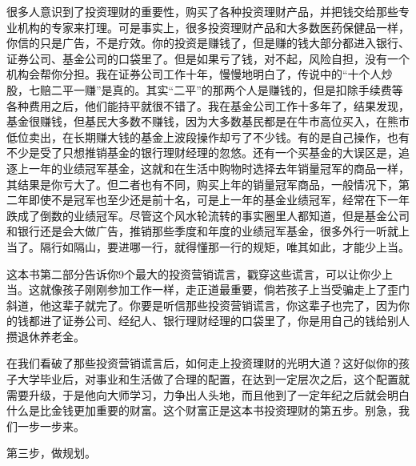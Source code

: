 很多人意识到了投资理财的重要性，购买了各种投资理财产品，并把钱交给那些专业机构的专家来打理。可是事实上，很多投资理财产品和大多数医药保健品一样，你信的只是广告，不是疗效。你的投资是赚钱了，但是赚的钱大部分都进入银行、证券公司、基金公司的口袋里了。但是如果亏了钱，对不起，风险自担，没有一个机构会帮你分担。我在证券公司工作十年，慢慢地明白了，传说中的“十个人炒股，七赔二平一赚”是真的。其实“二平”的那两个人是赚钱的，但是扣除手续费等各种费用之后，他们能持平就很不错了。我在基金公司工作十多年了，结果发现，基金很赚钱，但基民大多数不赚钱，因为大多数基民都是在牛市高位买入，在熊市低位卖出，在长期赚大钱的基金上波段操作却亏了不少钱。有的是自己操作，也有不少是受了只想推销基金的银行理财经理的忽悠。还有一个买基金的大误区是，追逐上一年的业绩冠军基金，这就和在生活中购物时选择去年销量冠军的商品一样，其结果是你亏大了。但二者也有不同，购买上年的销量冠军商品，一般情况下，第二年即使不是冠军也至少还是前十名，可是上一年的基金业绩冠军，经常在下一年跌成了倒数的业绩冠军。尽管这个风水轮流转的事实圈里人都知道，但是基金公司和银行还是会大做广告，推销那些季度和年度的业绩冠军基金，很多外行一听就上当了。隔行如隔山，要进哪一行，就得懂那一行的规矩，唯其如此，才能少上当。

这本书第二部分告诉你9个最大的投资营销谎言，戳穿这些谎言，可以让你少上当。这就像孩子刚刚参加工作一样，走正道最重要，倘若孩子上当受骗走上了歪门斜道，他这辈子就完了。你要是听信那些投资营销谎言，你这辈子也完了，因为你的钱都进了证券公司、经纪人、银行理财经理的口袋里了，你是用自己的钱给别人攒退休养老金。

在我们看破了那些投资营销谎言后，如何走上投资理财的光明大道？这好似你的孩子大学毕业后，对事业和生活做了合理的配置，在达到一定层次之后，这个配置就需要升级，于是他向大师学习，力争出人头地，而且他到了一定年纪之后就会明白什么是比金钱更加重要的财富。这个财富正是这本书投资理财的第五步。别急，我们一步一步来。

第三步，做规划。

